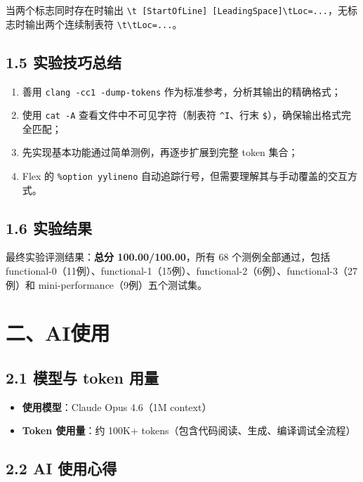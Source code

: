 \documentclass[12pt,a4paper]{article}
\begin{document}
当两个标志同时存在时输出 \texttt{\textbackslash t [StartOfLine] [LeadingSpace]\textbackslash tLoc=...}，无标志时输出两个连续制表符 \texttt{\textbackslash t\textbackslash tLoc=...}。

\subsection{1.5 实验技巧总结}

\begin{enumerate}[leftmargin=2em]
    \item 善用 \texttt{clang -cc1 -dump-tokens} 作为标准参考，分析其输出的精确格式；
    \item 使用 \texttt{cat -A} 查看文件中不可见字符（制表符 \texttt{\^{}I}、行末 \texttt{\$}），确保输出格式完全匹配；
    \item 先实现基本功能通过简单测例，再逐步扩展到完整 token 集合；
    \item Flex 的 \texttt{\%option yylineno} 自动追踪行号，但需要理解其与手动覆盖的交互方式。
\end{enumerate}

\subsection{1.6 实验结果}

最终实验评测结果：\textbf{总分 100.00/100.00}，所有 68 个测例全部通过，包括 functional-0（11例）、functional-1（15例）、functional-2（6例）、functional-3（27例）和 mini-performance（9例）五个测试集。

\section{二、AI使用}

\subsection{2.1 模型与 token 用量}

\begin{itemize}[leftmargin=2em]
    \item \textbf{使用模型}：Claude Opus 4.6（1M context）
    \item \textbf{Token 使用量}：约 100K+ tokens（包含代码阅读、生成、编译调试全流程）
\end{itemize}

\subsection{2.2 AI 使用心得}
\end{document}
